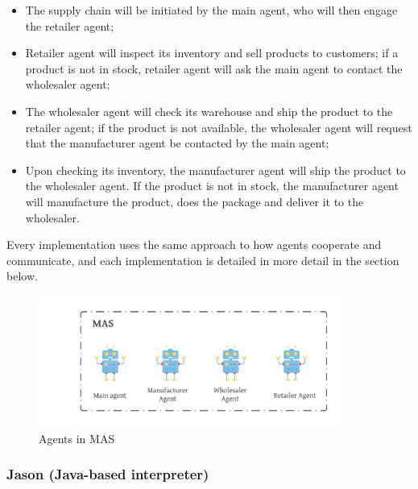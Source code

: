 \begin{itemize}
    \item The supply chain will be initiated by the main agent, who will then engage the retailer agent;
    
    \vspace{.5cm}
    
    \item Retailer agent will inspect its inventory and sell products to customers; if a product is not in stock, retailer agent will ask the main agent to contact the wholesaler agent;
    
    \vspace{.5cm}
    
    \item The wholesaler agent will check its warehouse and ship the product to the retailer agent; if the product is not available, the wholesaler agent will request that the manufacturer agent be contacted by the main agent;
    
    \vspace{.5cm}
    
    \item Upon checking its inventory, the manufacturer agent will ship the product to the wholesaler agent. If the product is not in stock, the manufacturer agent will manufacture the product, does the package and deliver it to the wholesaler.
    
    \vspace{.5cm}
    
\end{itemize}

Every implementation uses the same approach to how agents cooperate and communicate, and each implementation is detailed in more detail in the section below.

\begin{figure}[h]
\centering
  \includegraphics[width=10cm]{includes/figures/MAS.png} 
  \caption{Agents in \ac{MAS}}
  \label{Agents in MAS}
\end{figure}

\subsubsection{Jason (Java-based interpreter)}

